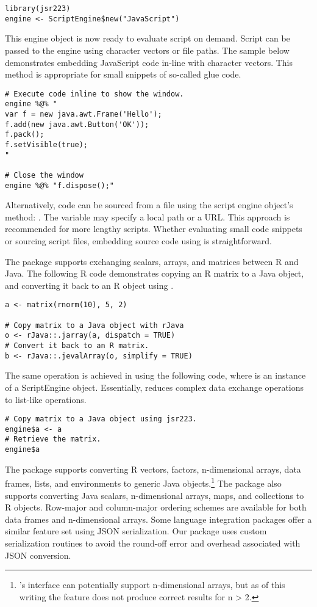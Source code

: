 \begin{verbatim}
library(jsr223)
engine <- ScriptEngine$new("JavaScript")
\end{verbatim}
This engine object is now ready to evaluate script on demand. Script can be passed to the engine using character vectors or file paths. The sample below demonstrates embedding JavaScript code in-line with character vectors. This method is appropriate for small snippets of so-called glue code. 

\begin{verbatim}
# Execute code inline to show the window.
engine %@% "
var f = new java.awt.Frame('Hello');
f.add(new java.awt.Button('OK'));
f.pack();
f.setVisible(true);
"

# Close the window
engine %@% "f.dispose();"
\end{verbatim}
Alternatively, code can be sourced from a file using the script engine object's  method: . The variable  may specify a local path or a URL. This approach is recommended for more lengthy scripts. Whether evaluating small code snippets or sourcing script files, embedding source code using  is straightforward.

The  package supports exchanging scalars, arrays, and matrices between R and Java. The following R code demonstrates copying an R matrix to a Java object, and converting it back to an R object using .

\begin{verbatim}
a <- matrix(rnorm(10), 5, 2)

# Copy matrix to a Java object with rJava
o <- rJava::.jarray(a, dispatch = TRUE)
# Convert it back to an R matrix.
b <- rJava::.jevalArray(o, simplify = TRUE)
\end{verbatim}
The same operation is achieved in  using the following code, where  is an instance of a  ScriptEngine object. Essentially,  reduces complex data exchange operations to list-like operations.

\begin{verbatim}
# Copy matrix to a Java object using jsr223.
engine$a <- a
# Retrieve the matrix.
engine$a
\end{verbatim}
The  package supports converting R vectors, factors, n-dimensional arrays, data frames, lists, and environments to generic Java objects.\footnote{'s interface can potentially support n-dimensional arrays, but as of this writing the feature does not produce correct results for n > 2.} The  package also supports converting Java scalars, n-dimensional arrays, maps, and collections to R objects. Row-major and column-major ordering schemes are available for both data frames and n-dimensional arrays. Some language integration packages offer a similar feature set using JSON serialization. Our package uses custom serialization routines to avoid the round-off error and overhead associated with JSON conversion.

